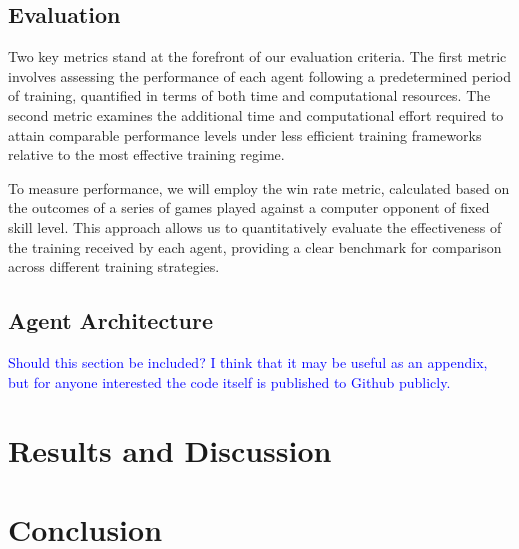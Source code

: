 \documentclass[journal]{IEEEtran}
\begin{document}
	\subsection{Evaluation}
	
	Two key metrics stand at the forefront of our evaluation criteria. The first metric involves assessing the performance of each agent following a predetermined period of training, quantified in terms of both time and computational resources. The second metric examines the additional time and computational effort required to attain comparable performance levels under less efficient training frameworks relative to the most effective training regime.
	
	To measure performance, we will employ the win rate metric, calculated based on the outcomes of a series of games played against a computer opponent of fixed skill level. This approach allows us to quantitatively evaluate the effectiveness of the training received by each agent, providing a clear benchmark for comparison across different training strategies.
	
	\subsection{Agent Architecture}
	
	\textcolor{blue}{Should this section be included? I think that it may be useful as an appendix, but for anyone interested the code itself is published to Github publicly.}
	
	\begin{comment}		
		The board state is held between turns using the python-chess api.
		The state is passed to the agent as a pair of \(8\times8\times7\) tensors representing a copy of the board for each of the \(7\) types of pieces. 
		
	\end{comment}
	
	\section{Results and Discussion}
	\label{sec:results_discussion}
	
	\textcolor{lightgray}{\blindtext}
	\begin{comment}
		Significant performance in predicting the moves that the stockfish engine will make next.
	\end{comment}
	
	
	\section{Conclusion}
	\label{sec:conclusion}
	\textcolor{lightgray}{\blindtext}
\end{document}

